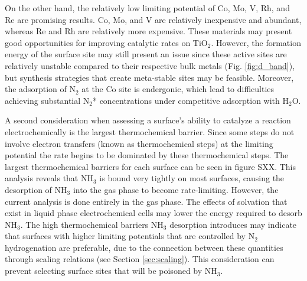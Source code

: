 On the other hand, the relatively low limiting potential of Co, Mo, V, Rh, and Re are promising results. Co, Mo, and V are relatively inexpensive and abundant, whereas Re and Rh are relatively more expensive. These materials may present good opportunities for improving catalytic rates on TiO$_2$. However, the formation energy of the surface site may still present an issue since these active sites are relatively unstable compared to their respective bulk metals (Fig. \ref{fig:d_band}), but synthesis strategies that create meta-stable sites may be feasible. Moreover, the adsorption of N$_2$ at the Co site is endergonic, which lead to difficulties achieving substantial N$_2$* concentrations under competitive adsorption with H$_2$O. %

A second consideration when assessing a surface's ability to catalyze a reaction electrochemically is the largest thermochemical barrier. Since some steps do not involve electron transfers (known as thermochemical steps) at the limiting potential the rate begins to be dominated by these thermochemical steps. The largest thermochemical barriers for each surface can be seen in figure SXX. This analysis reveals that NH$_3$ is bound very tightly on most surfaces, causing the desorption of NH$_3$ into the gas phase to become rate-limiting. However, the current analysis is done entirely in the gas phase. The effects of solvation that exist in liquid phase electrochemical cells may lower the energy required to desorb NH$_3$. The high thermochemical barriers NH$_3$ desorption introduces may indicate that surfaces with higher limiting potentials that are controlled by N$_2$ hydrogenation are preferable, due to the connection between these quantities through scaling relations (see Section \ref{sec:scaling}). This consideration can prevent selecting surface sites that will be poisoned by NH$_3$.

